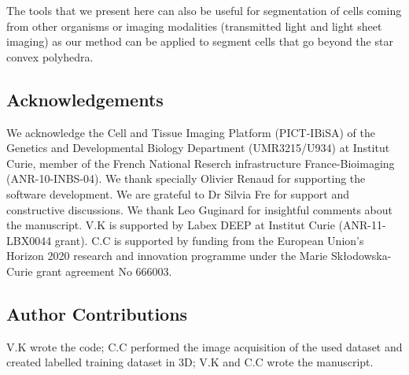 \documentclass[letterpaper,compsoc,twoside,onecolumn]{IEEEtran}
\begin{document}
The tools that we present here can also be useful for segmentation of cells coming from other organisms or imaging modalities (transmitted light and light sheet imaging) as our method can be applied to segment cells that go beyond the star convex polyhedra.

\subsection{Acknowledgements%
  \label{acknowledgements}%
}


We acknowledge the Cell and Tissue Imaging Platform (PICT-IBiSA) of the Genetics and Developmental Biology Department (UMR3215/U934) at Institut Curie, member of the French National Reserch infrastructure France-Bioimaging (ANR-10-INBS-04). We thank specially Olivier Renaud for supporting the software development. We are grateful to Dr Silvia Fre for support and constructive discussions. We thank Leo Guginard for insightful comments about the manuscript. V.K is supported by Labex DEEP at Institut Curie (ANR-11- LBX0044 grant). C.C is supported by funding from the European Union's Horizon 2020 research and innovation programme under the Marie Skłodowska-Curie grant agreement No 666003.

\subsection{Author Contributions%
  \label{author-contributions}%
}


V.K wrote the code; C.C performed the image acquisition of the used dataset and created labelled training dataset in 3D; V.K and C.C wrote the manuscript.


\end{document}
